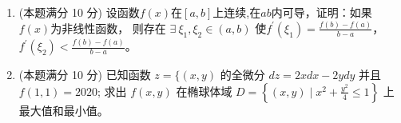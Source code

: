 \begin{enumerate}
\item 
(本题满分 10 分)
设函数$ f(x) $在$ [a,b] $上连续,在$ ab $内可导，证明：如果$ f(x) $为非线性函数，
则存在 $\exists \ \xi_{1}, \xi_{2} \in(a, b)$ 使$f^{\prime}(\xi_{1})=\frac{f(b)-f(a)}{b-a}$，$f^{\prime}\left(\xi_{2}\right)<\frac{f(b)-f(a)}{b-a}$。




\item 
(本题满分 10 分)
已知函数 $z=\{(x, y)$ 的全微分 $d z=2 x d x-2 y d y$ 并且 $f(1,1)=2020$; 求出
$f(x, y)$ 在椭球体域 $D=\left\{(x, y) \mid x^{2}+\frac{y^{2}}{4} \leq 1\right\}$ 上最大值和最小值。




	
	
	
\end{enumerate}



